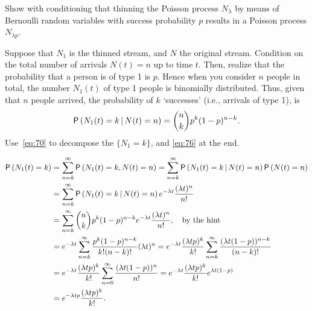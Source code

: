 \begin{extra}
  Show with conditioning that thinning the Poisson process $N_\lambda$ by means of Bernoulli random variables with success probability $p$ results in a Poisson process $N_{\lambda p}$.
  \begin{hint}
Suppose that  $N_1$ is the  thinned stream, and $N$ the original stream.  Condition on the total number of arrivals $N(t)=n$ up to time
      $t$. Then, realize that the probability that a person is of type 1 is $p$. Hence when you consider $n$ people in
      total, the number $N_1(t)$ of type 1 people is binomially distributed. Thus, given that $n$ people arrived, the probability of $k$ `successes' (i.e., arrivals of type 1), is 
      \begin{equation*}
        \P{N_1(t)=k \given N(t) = n} = {n \choose k} p^k (1-p)^{n-k}.
      \end{equation*}
Use~\eqref{eq:70} to decompose the $\{N_1=k\}$, and \eqref{eq:76} at the end. 
\end{hint}
\begin{solution}
\begin{align*}
    \P{N_1(t) = k}
&= \sum_{n=k}^\infty \P{N_1(t) =k, N(t) = n} 
= \sum_{n=k}^\infty \P{N_1(t) =k\given N(t) = n}\P{N(t)=n} \\
&= \sum_{n=k}^\infty \P{N_1(t) =k\given N(t) = n}e^{-\lambda t} \frac{(\lambda t)^n}{n!}\\
&= \sum_{n=k}^\infty {n \choose k} p^k (1-p)^{n-k} e^{-\lambda t} \frac{(\lambda t)^n}{n!}, \quad\text{by the hint}\\
&= e^{-\lambda t}\sum_{n=k}^\infty  \frac{p^k (1-p)^{n-k}}{k! (n-k)!} (\lambda t)^n
= e^{-\lambda t} \frac{(\lambda t p)^k}{k!} \sum_{n=k}^\infty  \frac{(\lambda t (1-p))^{n-k}}{(n-k)!}\\
&= e^{-\lambda t} \frac{(\lambda  t p)^k}{k!} \sum_{n=0}^\infty  \frac{(\lambda t (1-p))^{n}}{n!}
= e^{-\lambda t} \frac{(\lambda t p)^k}{k!} e^{\lambda t(1-p)} \\
&= e^{-\lambda t p} \frac{(\lambda t p)^k}{k!}.
\end{align*}
\end{solution}
\end{extra}    



